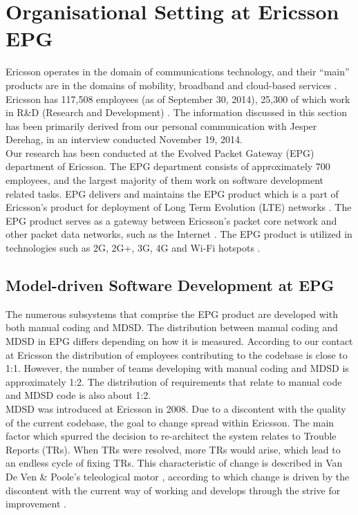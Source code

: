 \documentclass[final_report_innit.tex]{subfiles}
\begin{document}
\section{Organisational Setting at Ericsson EPG}
Ericsson operates in the domain of communications technology, and their ``main'' products are in the domains of mobility, broadband and cloud-based services \cite{etc}\cite{ecf}. Ericsson has 117,508 employees (as of September 30, 2014), 25,300 of which work in R\&D (Research and Development) \cite{etc}. The information discussed in this section has been primarily derived from our personal communication with Jesper Derehag, in an interview conducted November 19, 2014. 
\\

Our research has been conducted at the Evolved Packet Gateway (EPG) department of Ericsson. The EPG department consists of approximately 700 employees, and the largest majority of them work on software development related tasks. EPG delivers and maintains the EPG product which is a part of Ericsson’s product for deployment of Long Term Evolution (LTE) networks \cite{eepg}. The EPG product serves as a gateway between Ericsson’s packet core network and other packet data networks, such as the Internet \cite{eepg}. The EPG product is utilized in technologies such as 2G, 2G+, 3G, 4G and Wi-Fi hotspots \cite{eepg}.

\subsection*{Model-driven Software Development at EPG}
The numerous subsystems that comprise the EPG product are developed with both manual coding and MDSD. The distribution between manual coding and MDSD in EPG differs depending on how it is measured. According to our contact at Ericsson the distribution of employees contributing to the codebase is close to 1:1. However, the number of teams developing with manual coding and MDSD is approximately 1:2. The distribution of requirements that relate to manual code and MDSD code is also about 1:2.
\\

MDSD was introduced at Ericsson in 2008. Due to a discontent with the quality of the current codebase, the goal to change spread within Ericsson. The main factor which spurred the decision to re-architect the system relates to Trouble Reports (TRs). When TRs were resolved, more TRs would arise, which lead to an endless cycle of fixing TRs. This characteristic of change is described in Van De Ven \& Poole’s teleological motor \cite{van1995explaining}, according to which change is driven by the discontent with the current way of working and develops through the strive for improvement \cite{van1995explaining}. 
\\
\end{document}
